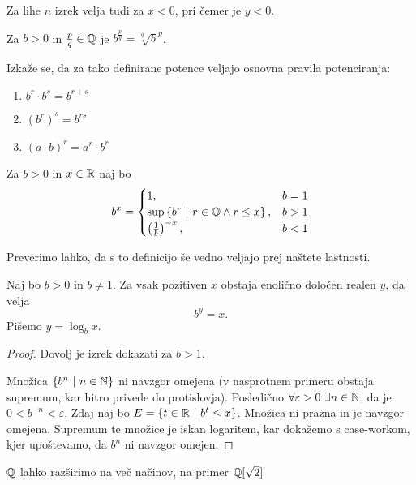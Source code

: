 \documentclass[12pt, a4paper]{article}
\begin{document}
\begin{opomba}
Za lihe $n$ izrek velja tudi za $x<0$, pri čemer je $y<0$.
\end{opomba}

\begin{definicija}
Za $b>0$ in $\frac{p}{q}\in\mathbb{Q}$ je $b^\frac{p}{q}=\sqrt[q]{b}^p$.
\end{definicija}

Izkaže se, da za tako definirane potence veljajo osnovna pravila potenciranja:

\begin{enumerate}[label=\roman*)]
\item $b^r\cdot b^s=b^{r+s}$
\item $(b^r)^s=b^{rs}$
\item $(a\cdot b)^r=a^r\cdot b^r$
\end{enumerate}

\begin{definicija}
Za $b>0$ in $x\in\mathbb{R}$ naj bo 
\[
b^x=\begin{cases}
1, &b=1 \\
\sup\left\{b^r~\middle\vert~r\in\mathbb{Q}\land r\leq x\right\}, &b>1 \\
\left(\frac{1}{b}\right)^{-x}, &b<1
\end{cases}
\]
\end{definicija}

Preverimo lahko, da s to definicijo še vedno veljajo prej naštete lastnosti.

\begin{izrek}
Naj bo $b>0$ in $b\ne 1$. Za vsak pozitiven $x$ obstaja enolično določen realen $y$, da velja
\[
b^y=x.
\]
Pišemo $y=\log_b x$.
\end{izrek}

\begin{proof}
Dovolj je izrek dokazati za $b>1$.

Množica $\left\{b^n~\middle\vert~n\in\mathbb{N}\right\}$ ni navzgor omejena (v nasprotnem primeru obstaja supremum, kar hitro privede do protislovja). Posledično $\forall\varepsilon>0~\exists n\in\mathbb{N}$, da je $0<b^{-n}<\varepsilon$. Zdaj naj bo $E=\left\{t\in\mathbb{R}~\middle\vert~b^t\leq x\right\}$. Množica ni prazna in je navzgor omejena. Supremum te množice je iskan logaritem, kar dokažemo s case-workom, kjer upoštevamo, da $b^n$ ni navzgor omejen.
\end{proof}

\begin{opomba}
$\mathbb{Q}$ lahko razširimo na več načinov, na primer $\mathbb{Q}[\sqrt{2}]$
\end{opomba}
\end{document}
